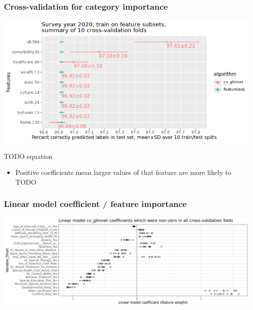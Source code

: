 \documentclass{beamer}
\begin{document}
\begin{frame}
  \frametitle{Cross-validation for category importance}
  \includegraphics[width=\textwidth]{download-nsch-mlr3batchmark-registry-one-set-compare-features.png}

TODO equation

  \begin{itemize}
  \item Positive coefficients mean larger values of that feature are
    more likely to TODO
  \end{itemize}
\end{frame}

\begin{frame}
  \frametitle{Linear model coefficient / feature importance}
  \includegraphics[width=\textwidth]{download-nsch-mlr3batchmark-registry-glmnet-coef-all.png}
\end{frame}
\end{document}
